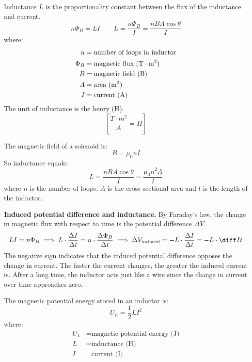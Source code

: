 \documentclass{article}
\newcommand{\theorem}[2]{\begin{tcolorbox}[title={#1},colback=blue!5!white,colframe=blue!75!black,parbox=false] #2 \end{tcolorbox}}
\begin{document}
\theorem{Inductance}{
	Inductance $L$ is the proportionality constant between the flux of the inductance and current.
	\begin{equation*}
	    n\Phi_B=LI 
		\qquad
		L
		=\frac{n\Phi_B}{I}
		=\frac{nBA\cos\theta}{I}
	\end{equation*}
	where:
	\begin{align*}
		n&=\text{number of loops in inductor} \\
		\Phi_B&=\text{magnetic flux (\si{T\cdot m^2})} \\
		B&=\text{magnetic field (B)} \\
		A&=\text{area (\si{m^2})} \\
		I&=\text{current (A)}
	\end{align*}
	The unit of inductance is the henry (H).
	\begin{equation*}
		\left[ \frac{\si{T\cdot m^2}}{\si{A}}=\si{H} \right]
	\end{equation*}
}

The magnetic field of a solenoid is:
\begin{equation*}
    B=\mu_0 nI
\end{equation*}
So inductance equals:
\begin{equation*}
    L=\frac{nBA\cos\theta}{I}=\frac{\mu_0 n^2 A}{l}
\end{equation*}
where $n$ is the number of loops, $A$ is the cross-sectional area and $l$ is the length of the inductor.

\textbf{Induced potential difference and inductance.} By Faraday's law, the change in magnetic flux with respect to time is the potential difference $\Delta V$.
\begin{equation*}
    LI=n\Phi_B
	\implies L\cdot \frac{\Delta I}{\Delta t}=n \cdot \frac{\Delta \Phi_B}{\Delta t}
	\implies
	\Delta V_\text{induced}=-L\cdot \frac{\Delta I}{\Delta t}=-L\cdot \diff It
\end{equation*}
The negative sign indicates that the induced potential difference opposes the change in current. The faster the current changes, the greater the induced current is. After a long time, the inductor acts just like a wire since the change in current over time approaches zero.

\theorem{Energy stored in inductor}{
	The magnetic potential energy stored in an inductor is:
	\begin{equation*}
	    U_L=\frac12LI^2
	\end{equation*}
	where:
	\begin{align*}
		U_L&=\text{magnetic potential energy (J)} \\
		L&=\text{inductance (H)} \\
		I&=\text{current (I)}
	\end{align*}
}
\end{document}
